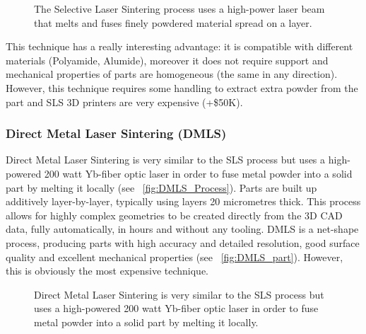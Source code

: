 \begin{figure}[tb]
    \centering
        \hfil
        \hfil
    \caption{The Selective Laser Sintering process uses a high-power laser beam that melts and fuses finely powdered material spread on a layer.}
    \label{fig:SLS_technique}
\end{figure}

This technique has a really interesting advantage: it is compatible with different materials (Polyamide, Alumide), moreover it does not require support and mechanical properties of parts are homogeneous (the same in any direction). However, this technique requires some handling to extract extra powder from the part and SLS 3D printers are very expensive (+\$50K).


\subsubsection{Direct Metal Laser Sintering (DMLS)} %

Direct Metal Laser Sintering is very similar to the SLS process but uses a high-powered 200 watt Yb-fiber optic laser in order to fuse metal powder into a solid part by melting it locally (see \figurename~\ref{fig:DMLS_Process}). Parts are built up additively layer-by-layer, typically using layers 20 micrometres thick. This process allows for highly complex geometries to be created directly from the 3D CAD data, fully automatically, in hours and without any tooling. DMLS is a net-shape process, producing parts with high accuracy and detailed resolution, good surface quality and excellent mechanical properties (see \figurename~\ref{fig:DMLS_part}). However, this is obviously the most expensive technique.

\begin{figure}[tb]
    \centering
        \hfil
        \hfil
    \caption{Direct Metal Laser Sintering is very similar to the SLS process but uses a high-powered 200 watt Yb-fiber optic laser in order to fuse metal powder into a solid part by melting it locally.}
    \label{fig:DMLS_technique}
\end{figure}


